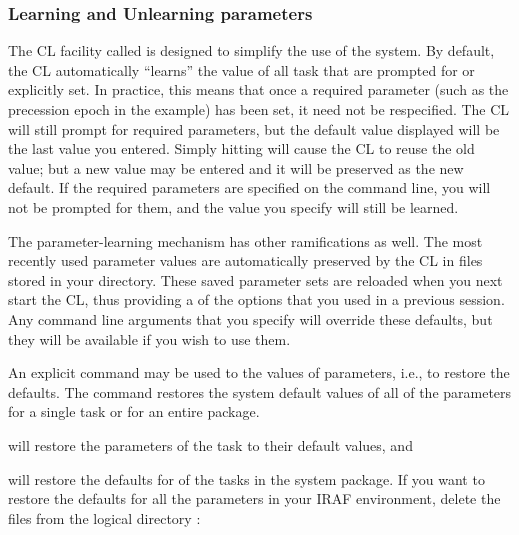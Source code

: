 \subsubsection{Learning and Unlearning parameters}

\ppind
The CL facility called  is designed
to simplify the use of the system.
By default, the CL automatically ``learns'' the value of all task
 that are prompted for or explicitly set.  In practice,
this means that once a required parameter (such as the precession epoch in
the  example)
has been set, it need not be respecified.  The CL will still prompt for
required parameters, but the default value displayed will be the
last value you entered.  Simply hitting  will cause the CL
to reuse the old value; but a new value may be entered and it will
be preserved as the new default. If the required parameters are
specified on the command line, you will not be prompted for them, and the
value you specify will still be learned.

The parameter-learning mechanism has other ramifications as well.
The most recently used parameter values are automatically preserved
by the CL in  files stored in your  directory.  
These saved parameter
sets are reloaded when you next start the CL, thus providing a
 of the options that you used in a previous session.  
Any command line arguments
that you specify will override these  defaults, but they
will be available if you wish to use them.

An explicit command may be used to
 the values of parameters,
i.e., to restore the defaults. The  command restores the
system default values of all of the parameters for a single task or for an
entire package.

\begin{quotation}\noindent
{} 
\end{quotation}

\noindent
will restore the parameters of the task  to their default
values, and

\begin{quotation}\noindent
{} 
\end{quotation}

\noindent
will restore the defaults for  of the tasks in the system
package. If you want to restore the defaults for all the parameters in your
IRAF environment, delete the  files from the logical directory
 :

